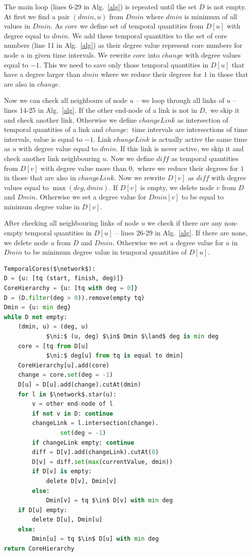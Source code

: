 \documentclass[a4paper,twoside,10pt]{article}
\newcommand{\network}{\mathcal{N}}
\begin{document}
The main loop (lines 6-29 in Alg.~\ref{alg}) is repeated until the set $D$ is not empty. At first we find a pair $(dmin, u)$ from $Dmin$ where $dmin$ is minimum of all values in $Dmin.$ As $core$ we define set of temporal quantities from $D[u]$ with degree equal to $dmin.$ We add these temporal quantities to the set of core numbers (line 11 in Alg.~\ref{alg}) as their degree value represent core numbers for node $u$ in given time intervals. We rewrite $core$ into  $change$ with degree values equal to $-1.$  This we need to save only those temporal quantities in $D[u]$ that have a degree larger than $dmin$ where we reduce their degrees for $1$ in those that are also in $change.$ 

Now we can check all neighbours of node $u$ -- we loop through all links of $u$ -- lines 14-25 in Alg.~\ref{alg}. If the other end-node of a link is not in $D,$ we skip it and check another link. Otherwise we define $changeLink$ as intersection of temporal quantities of a link and $change:$ time intervals are intersections of time intervals, value is equal to $-1.$ Link $changeLink$ is actually active the same time as $u$ with degree value equal to $dmin.$ If this link is never active, we skip it and check another link neighbouring $u.$ Now we define $diff$ as temporal quantities from $D[v]$ with degree value more than $0,$ where we reduce their degrees for $1$ in those that are also in $changeLink.$ Now we rewrite $D[v]$ as $diff$ with degree values equal to $\max(deg, dmin).$ If $D[v]$ is empty, we delete node $v$ from $D$ and $Dmin.$ Otherwise we set a degree value for $Dmin[v]$ to be equal to minimum degree value in $D[v].$

After checking all neighbouring links of node $u$ we check if there are any non-empty temporal quantities in $D[u]$ -- lines 26-29 in Alg.~\ref{alg}. If there are none, we delete node $u$ from $D$ and $Dmin.$ Otherwise we set a degree value for $u$ in $Dmin$ to be minimum degree value in temporal quantities of $D[u].$

\begin{lstlisting}[mathescape, language=Python, caption={Simple algorithm for cores in temporal networks.}, label={alg}]		
TemporalCores($\network$):
D = {u: [tq (start, finish, deg)]}
CoreHierarchy = {u: [tq with deg = 0]}
D = (D.filter(deg > 0)).remove(empty tq)
Dmin = {u: min deg}
while D not empty:
	(dmin, u) = (deg, u) 
			$\ni:$ (u, deg) $\in$ Dmin $\land$ deg is min deg
	core = [tq from D[u] 
			$\ni:$ deg[u] from tq is equal to dmin]
	CoreHierarchy[u].add(core)
	change = core.set(deg = -1)
	D[u] = D[u].add(change).cutAt(dmin)
	for l in $\network$.star(u):
		v = other end-node of l
		if not v in D: continue
		changeLink = l.intersection(change).
				set(deg = -1)
		if changeLink empty: continue
		diff = D[v].add(changeLink).cutAt(0)
		D[v] = diff.set(max(currentValue, dmin))
		if D[v] is empty:
			delete D[v], Dmin[v]
		else:
			Dmin[v] = tq $\in$ D[v] with min deg
	if D[u] empty:
		delete D[u], Dmin[u]
	else:
		Dmin[u] = tq $\in$ D[u] with min deg
return CoreHierarchy
\end{lstlisting}
\end{document}
